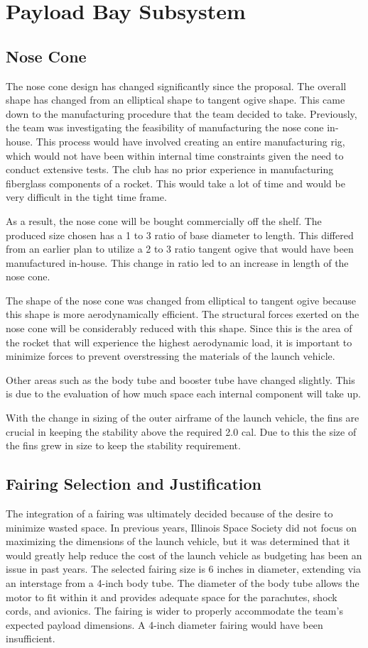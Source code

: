 \section{Payload Bay Subsystem}

    \subsection{Nose Cone}
    The nose cone design has changed significantly since the proposal. The overall shape has changed from an elliptical shape to tangent ogive shape. This came down to the manufacturing procedure that the team decided to take. Previously, the team was investigating the feasibility of manufacturing the nose cone in-house. This process would have involved creating an entire manufacturing rig, which would not have been within internal time constraints given the need to conduct extensive tests. The club has no prior experience in manufacturing fiberglass components of a rocket. This would take a lot of time and would be very difficult in the tight time frame. 

As a result, the nose cone will be bought commercially off the shelf. The produced size chosen has a 1 to 3 ratio of base diameter to length. This differed from an earlier plan to utilize a 2 to 3 ratio tangent ogive that would have been manufactured in-house. This change in ratio led to an increase in length of the nose cone.

The shape of the nose cone was changed from elliptical to tangent ogive because this shape is more aerodynamically efficient. The structural forces exerted on the nose cone will be considerably reduced with this shape. Since this is the area of the rocket that will experience the highest aerodynamic load, it is important to minimize forces to prevent overstressing the materials of the launch vehicle.

Other areas such as the body tube and booster tube have changed slightly. This is due to the evaluation of how much space each internal component will take up.

With the change in sizing of the outer airframe of the launch vehicle, the fins are crucial in keeping the stability above the required 2.0 cal. Due to this the size of the fins grew in size to keep the stability requirement.  


    \subsection{Fairing Selection and Justification}
 The integration of a fairing was ultimately decided because of the desire to minimize wasted space. In previous years, Illinois Space Society did not focus on maximizing the dimensions of the launch vehicle, but it was determined that it would greatly help reduce the cost of the launch vehicle as budgeting has been an issue in past years. The selected fairing size is 6 inches in diameter, extending via an interstage from a 4-inch body tube. The diameter of the body tube allows the motor to fit within it and provides adequate space for the parachutes, shock cords, and avionics. The fairing is wider to properly accommodate the team’s expected payload dimensions. A 4-inch diameter fairing would have been insufficient.


